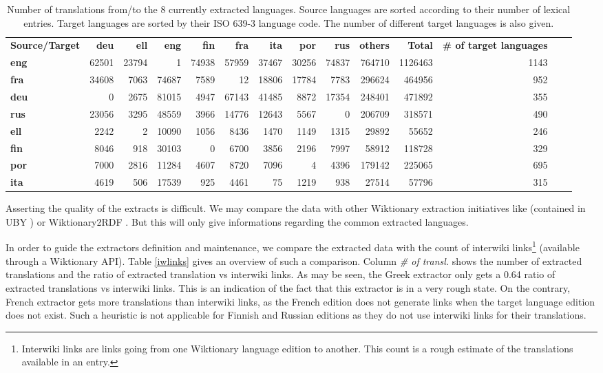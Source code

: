 \documentclass[sw]{iosart2c}
\begin{document}
\begin{table}[htb]
\begin{tabular}{lrrrrrrrrrrrrr}
\textbf{Source/Target}  & \textbf{deu} & \textbf{ell} & \textbf{eng} & \textbf{fin} & \textbf{fra} & \textbf{ita} & \textbf{por} & \textbf{rus}& \textbf{others} & \textbf{Total} & \textbf{\# of target languages}\\
\textbf{eng} & 62501 & 23794 & 1 & 74938 & 57959 & 37467 & 30256 & 74837 & 764710 & 1126463 & 1143\\
\textbf{fra} & 34608 & 7063 & 74687 & 7589 & 12 & 18806 & 17784 & 7783 & 296624 & 464956 & 952\\
\textbf{deu} & 0 & 2675 & 81015 & 4947 & 67143 & 41485 & 8872 & 17354 & 248401 & 471892 & 355\\
\textbf{rus} & 23056 & 3295 & 48559 & 3966 & 14776 & 12643 & 5567 & 0 & 206709 & 318571 & 490\\
\textbf{ell} & 2242 & 2 & 10090 & 1056 & 8436 & 1470 & 1149 & 1315 & 29892 & 55652 & 246\\
\textbf{fin} & 8046 & 918 & 30103 & 0 & 6700 & 3856 & 2196 & 7997 & 58912 & 118728 & 329\\
\textbf{por} & 7000 & 2816 & 11284 & 4607 & 8720 & 7096 & 4 & 4396 & 179142 & 225065 & 695\\
\textbf{ita} & 4619 & 506 & 17539 & 925 & 4461 & 75 & 1219 & 938 & 27514 & 57796 & 315\\
\end{tabular}
\caption{Number of translations from/to the 8 currently extracted languages. Source languages are sorted according to their number of lexical entries. Target languages are sorted by their ISO 639-3 language code. The number of different target languages is also given.}\label{tradsize}
\end{table}

Asserting the quality of the extracts is difficult. We may compare the data with other Wiktionary extraction initiatives like \cite{Zesch08Wikipedia} (contained in UBY \cite{UBY:TUD-CS-2012-0023}) or Wiktionary2RDF \cite{DBLP:conf/aswc/HellmannBA12}. But this will only give informations regarding the common extracted languages. 

In order to guide the extractors definition and maintenance, we compare the extracted data with the count of interwiki links\footnote{Interwiki links are links going from one Wiktionary language edition to another. This count is a rough estimate of the translations available in an entry.} (available through a Wiktionary API). Table \ref{iwlinks} gives an overview of such a comparison. Column \textit{\# of transl.} shows the number of extracted translations and the ratio of extracted translation vs interwiki links. As may be seen, the Greek extractor only gets a 0.64 ratio of extracted translations vs interwiki links. This is an indication of the fact that this extractor is in a very rough state. On the contrary, French extractor gets more translations than interwiki links, as the French edition does not generate links when the target language edition does not exist. Such a heuristic is not applicable for Finnish and Russian editions as they do not use interwiki links for their translations.
\end{document}
